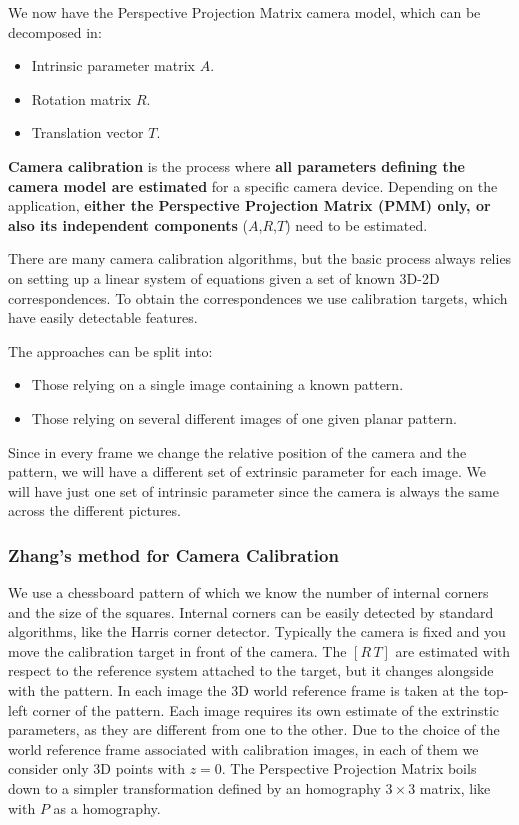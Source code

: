 \documentclass{article}
\begin{document}
We now have the Perspective Projection Matrix camera model, which can be decomposed in:
\begin{itemize}
  \item Intrinsic parameter matrix $A$.
  \item Rotation matrix $R$.
  \item Translation vector $T$.
\end{itemize}

\textbf{Camera calibration} is the process where \textbf{all parameters defining the camera model are estimated} for a specific camera device.
Depending on the application, \textbf{either the Perspective Projection Matrix (PMM) only, or also its independent components} ($A$,$R$,$T$) need to be estimated.

There are many camera calibration algorithms, but the basic process always relies on setting up a linear system of equations given a set of known 3D-2D correspondences.
To obtain the correspondences we use calibration targets, which have easily detectable features.

The approaches can be split into:
\begin{itemize}
  \item Those relying on a single image containing a known pattern.
  \item Those relying on several different images of one given planar pattern.
\end{itemize}

Since in every frame we change the relative position of the camera and the pattern, we will have a different set of extrinsic parameter for each image.
We will have just one set of intrinsic parameter since the camera is always the same across the different pictures.

\subsubsection{Zhang's method for Camera Calibration}

We use a chessboard pattern of which we know the number of internal corners and the size of the squares.
Internal corners can be easily detected by standard algorithms, like the Harris corner detector.
Typically the camera is fixed and you move the calibration target in front of the camera.
The $[R\,T]$ are estimated with respect to the reference system attached to the target, but it changes alongside with the pattern.
In each image the 3D world reference frame is taken at the top-left corner of the pattern.
Each image requires its own estimate of the extrinstic parameters, as they are different from one to the other.
Due to the choice of the world reference frame associated with calibration images, in each of them we consider only 3D points with $z=0$.
The Perspective Projection Matrix boils down to a simpler transformation defined by an homography $3\times 3$ matrix, like with $P$ as a homography.
\end{document}
